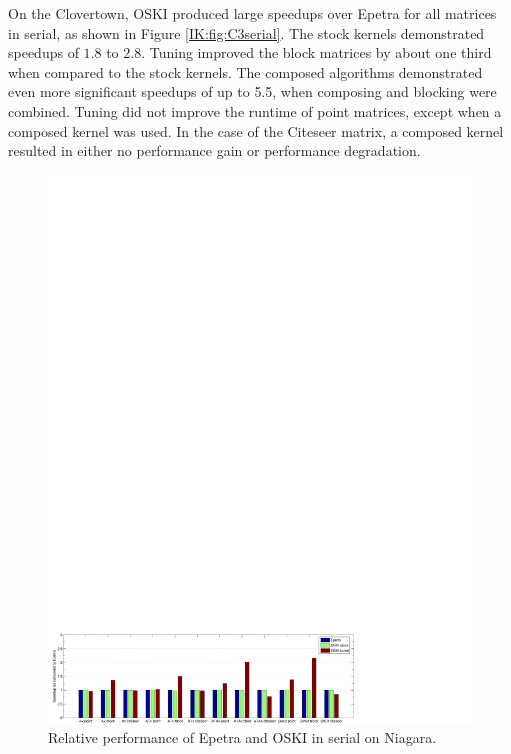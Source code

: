 On the Clovertown, OSKI produced large speedups over Epetra for all matrices in serial,
as shown in Figure \ref{IK:fig:C3serial}.
The stock kernels demonstrated speedups of $1.8$ to $2.8$.  Tuning improved the block matrices by about one third
when compared to the stock kernels. The composed algorithms demonstrated even more significant speedups of up to
5.5, when composing and blocking were combined.
Tuning did not improve the runtime of point matrices, except when a composed
kernel was used.  In the
case of the Citeseer matrix, a composed kernel resulted in either no performance gain or performance
degradation.



\begin{figure}[htbp]
\begin{center}
\includegraphics[scale=.8]{./plots/hypnotoadserial.pdf}
\caption{Relative performance of Epetra and OSKI in serial on Niagara.}
\label{IK:fig:hypnotoadserial}
\end{center}
\end{figure}

